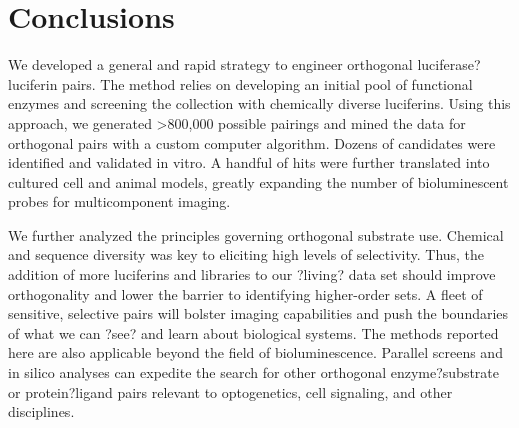 \section{Conclusions}
We developed a general and rapid strategy to engineer orthogonal luciferase?luciferin pairs. The method relies on developing an initial pool of functional enzymes and screening the collection with chemically diverse luciferins. Using this approach, we generated >800,000 possible pairings and mined the data for orthogonal pairs with a custom computer algorithm. Dozens of candidates were identified and validated in vitro. A handful of hits were further translated into cultured cell and animal models, greatly expanding the number of bioluminescent probes for multicomponent imaging.
\par
We further analyzed the principles governing orthogonal substrate use. Chemical and sequence diversity was key to eliciting high levels of selectivity. Thus, the addition of more luciferins and libraries to our ?living? data set should improve orthogonality and lower the barrier to identifying higher-order sets. A fleet of sensitive, selective pairs will bolster imaging capabilities and push the boundaries of what we can ?see? and learn about biological systems. The methods reported here are also applicable beyond the field of bioluminescence. Parallel screens and in silico analyses can expedite the search for other orthogonal enzyme?substrate or protein?ligand pairs relevant to optogenetics, cell signaling, and other disciplines.




